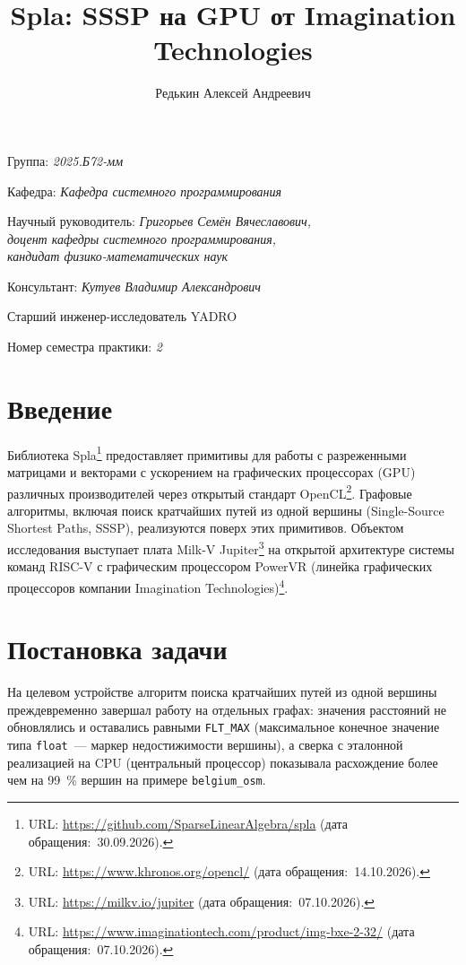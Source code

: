 \documentclass[a4paper]{article}
\title{Spla: SSSP на GPU от Imagination Technologies}
\author{Редькин Алексей Андреевич}
\date{}
\begin{document}
\maketitle

\begin{flushright}
    Группа: \emph{2025.Б72-мм}

    Кафедра: \emph{Кафедра системного программирования}

    Научный руководитель: \emph{Григорьев Семён Вячеславович,}\\
    \emph{доцент кафедры системного программирования,}\\
    \emph{кандидат физико-математических наук}

    Консультант: \emph{Кутуев Владимир Александрович}

    Старший инженер-исследователь YADRO

    Номер семестра практики: \emph{2}
\end{flushright}

\section{Введение}

Библиотека Spla\footnote{URL: \url{https://github.com/SparseLinearAlgebra/spla} (дата обращения:~30.09.2026).} предоставляет примитивы для работы с разреженными матрицами и векторами с ускорением на графических процессорах (GPU) различных производителей через открытый стандарт OpenCL\footnote{URL: \url{https://www.khronos.org/opencl/} (дата обращения:~14.10.2026).}. Графовые алгоритмы, включая поиск кратчайших путей из одной вершины (Single-Source Shortest Paths, SSSP), реализуются поверх этих примитивов. Объектом исследования выступает плата Milk-V Jupiter\footnote{URL: \url{https://milkv.io/jupiter} (дата обращения:~07.10.2026).} на открытой архитектуре системы команд RISC-V с графическим процессором PowerVR (линейка графических процессоров компании Imagination Technologies)\footnote{URL: \url{https://www.imaginationtech.com/product/img-bxe-2-32/} (дата обращения:~07.10.2026).}.

\section{Постановка задачи}

На целевом устройстве алгоритм поиска кратчайших путей из одной вершины преждевременно завершал работу на отдельных графах: значения расстояний не обновлялись и оставались равными \texttt{FLT\_MAX} (максимальное конечное значение типа \texttt{float}~--- маркер недостижимости вершины), а сверка с эталонной реализацией на CPU (центральный процессор) показывала расхождение более чем на 99~\% вершин на примере \texttt{belgium\_osm}.
\end{document}
